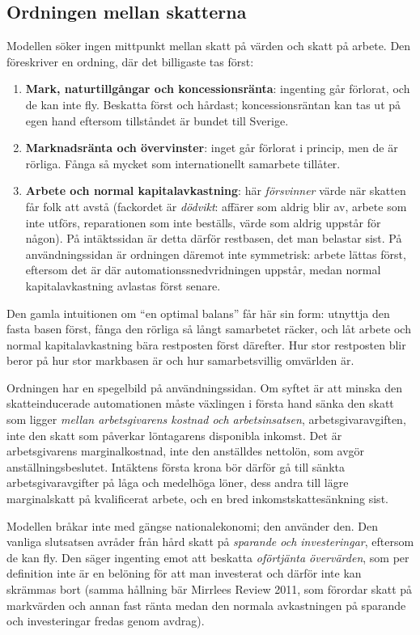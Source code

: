 \documentclass[11pt]{article}
\begin{document}
\subsection*{Ordningen mellan skatterna}

Modellen söker ingen mittpunkt mellan skatt på värden och skatt på arbete. Den föreskriver en ordning, där det billigaste tas först:

\begin{enumerate}
\item \textbf{Mark, naturtillgångar och koncessionsränta}: ingenting går förlorat, och de kan inte fly. Beskatta först och hårdast; koncessionsräntan kan tas ut på egen hand eftersom tillståndet är bundet till Sverige.
\item \textbf{Marknadsränta och övervinster}: inget går förlorat i princip, men de är rörliga. Fånga så mycket som internationellt samarbete tillåter.
\item \textbf{Arbete och normal kapitalavkastning}: här \emph{försvinner} värde när skatten får folk att avstå (fackordet är \emph{dödvikt}: affärer som aldrig blir av, arbete som inte utförs, reparationen som inte beställs, värde som aldrig uppstår för någon). På intäktssidan är detta därför restbasen, det man belastar sist. På användningssidan är ordningen däremot inte symmetrisk: arbete lättas först, eftersom det är där automationssnedvridningen uppstår, medan normal kapitalavkastning avlastas först senare.
\end{enumerate}

Den gamla intuitionen om \enquote{en optimal balans} får här sin form: utnyttja den fasta basen först, fånga den rörliga så långt samarbetet räcker, och låt arbete och normal kapitalavkastning bära restposten först därefter. Hur stor restposten blir beror på hur stor markbasen är och hur samarbetsvillig omvärlden är.

Ordningen har en spegelbild på användningssidan. Om syftet är att minska den skatteinducerade automationen måste växlingen i första hand sänka den skatt som ligger \emph{mellan arbetsgivarens kostnad och arbetsinsatsen}, arbetsgivaravgiften, inte den skatt som påverkar löntagarens disponibla inkomst. Det är arbetsgivarens marginalkostnad, inte den anställdes nettolön, som avgör anställningsbeslutet. Intäktens första krona bör därför gå till sänkta arbetsgivaravgifter på låga och medelhöga löner, dess andra till lägre marginalskatt på kvalificerat arbete, och en bred inkomstskattesänkning sist.

Modellen bråkar inte med gängse nationalekonomi; den använder den. Den vanliga slutsatsen avråder från hård skatt på \emph{sparande och investeringar}, eftersom de kan fly. Den säger ingenting emot att beskatta \emph{oförtjänta övervärden}, som per definition inte är en belöning för att man investerat och därför inte kan skrämmas bort (samma hållning bär Mirrlees Review 2011, som förordar skatt på markvärden och annan fast ränta medan den normala avkastningen på sparande och investeringar fredas genom avdrag).
\end{document}
